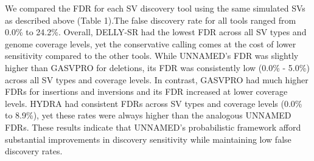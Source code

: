 \documentclass[11pt]{article}
\begin{document}
We compared the FDR for each SV discovery tool using the same simulated
SVs as described above (Table 1).The false discovery rate for all tools ranged 
from 0.0\% to 24.2\%. Overall, DELLY-SR had the lowest FDR across all SV types
and genome coverage levels, yet the conservative calling comes at the cost of
lower sensitivity compared to the other tools. While UNNAMED's FDR was 
slightly higher than GASVPRO for deletions, its FDR was consistently 
low (0.0\% - 5.0\%) across all SV types and coverage levels. In contrast, 
GASVPRO had much higher FDRs for insertions and inversions and
its FDR increased at lower coverage levels.  HYDRA had consistent FDRs across
SV types and coverage levels (0.0\% to 8.9\%), yet these rates were always 
higher than the analogous UNNAMED FDRs. These results indicate that UNNAMED's
probabilistic framework afford substantial improvements in discovery
sensitivity while maintaining low false discovery rates.
\end{document}
